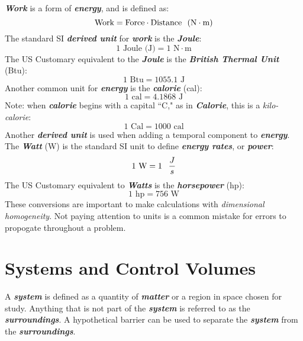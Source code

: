 \vspace{0.1in}
\textbf{\textit{Work}} is a form of \textbf{\textit{energy}}, and is defined as:
%
\begin{equation}
\text{Work} = \text{Force}\cdot\text{Distance \hphantom{-}(N}\cdot\text{m)}
\end{equation}
%
The standard SI \textbf{\textit{derived unit}} for \textbf{\textit{work}} is the \textbf{\textit{Joule}}:
%
\begin{equation}
1 \text{ Joule (J)} = 1 \text{ N}\cdot\text{m}
\end{equation}
%
The US Customary equivalent to the \textbf{\textit{Joule}} is the \textbf{\textit{British Thermal Unit}} (Btu):
%
\begin{equation}
1 \text{ Btu} = 1055.1 \text{ J}
\end{equation}
%
Another common unit for \textbf{\textit{energy}} is the \textbf{\textit{calorie}} (cal):
%
\begin{equation}
1 \text{ cal} = 4.1868 \text{ J}
\end{equation}
%
Note: when \textbf{\textit{calorie}} begins with a capital ``C," as in \textbf{\textit{Calorie}}, this is a \textit{kilo-calorie}:
%
\begin{equation}
1 \text{ Cal} = 1000 \text{ cal}
\end{equation}
%
Another \textbf{\textit{derived unit}} is used when adding a temporal component to \textbf{\textit{energy}}. The \textbf{\textit{Watt}} (W) is the standard SI unit to define \textbf{\textit{energy rates}}, or \textbf{\textit{power}}:
%
\begin{equation}
1 \text{ W} = 1 \hphantom{-} \frac{J}{s}
\end{equation}
%
The US Customary equivalent to \textbf{\textit{Watts}} is the \textbf{\textit{horsepower}} (hp):
%
\begin{equation}
1 \text{ hp} = 756 \text{ W}
\end{equation}
%
These conversions are important to make calculations with \textit{dimensional homogeneity}. Not paying attention to units is a common mistake for errors to propogate throughout a problem.
\section{Systems and Control Volumes}
A \textbf{\textit{system}} is defined as a quantity of \textbf{\textit{matter}} or a region in space chosen for study. Anything that is not part of the \textbf{\textit{system}} is referred to as the \textbf{\textit{surroundings}}. A hypothetical barrier can be used to separate the \textbf{\textit{system}} from the \textbf{\textit{surroundings}}.

